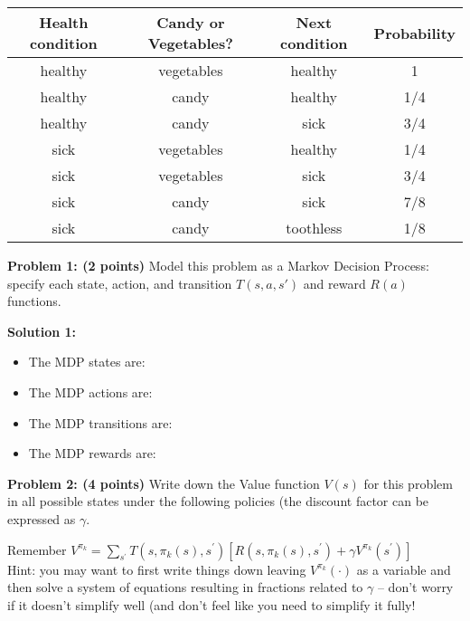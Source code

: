\documentclass[]{article}
\begin{document}
\begin{table}[htb]
\centering
    \begin{tabular}{|c|c|c|c|}
      \hline
        Health condition &  Candy or Vegetables? &  Next condition & Probability \\\hline
        healthy &   vegetables &    healthy &   1 \\\hline
        healthy &   candy & healthy &   1/4 \\\hline
        healthy &   candy & sick &  3/4 \\\hline
        sick &  vegetables &    healthy &   1/4 \\\hline
        sick &  vegetables &    sick &  3/4 \\\hline
        sick &  candy & sick &  7/8 \\\hline
        sick &  candy & toothless &     1/8 \\\hline
    \end{tabular}
\end{table}

\textbf{Problem 1: (2 points)}
Model this problem as a Markov Decision Process: specify each state, action, and transition $T(s,a,s')$ and reward $R(a)$ functions.

\bigskip

\textbf{Solution 1:}
\begin{itemize}
    \item The MDP states are:
    \item The MDP actions are:
    \item The MDP transitions are:
    \item The MDP rewards are:
\end{itemize}

\clearpage
\textbf{Problem 2: (4 points)}
Write down the Value function $V(s)$ for this problem in all possible states under the following policies (the discount factor can be expressed as $\gamma$.

Remember $V^{\pi_k} = \sum_{s^\prime} T(s,\pi_k(s),s^{\prime})\left[R(s,\pi_k(s),s^\prime) + \gamma V^{\pi_k}(s^\prime)\right]$\\

Hint: you may want to first write things down leaving $V^{\pi_k}(\cdot)$ as a variable and then solve a system of equations resulting in fractions related to $\gamma$ -- don't worry if it doesn't simplify well (and don't feel like you need to simplify it fully!
\end{document}
